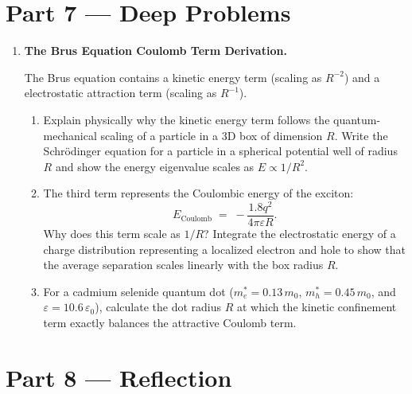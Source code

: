\documentclass[12pt, a4paper]{book}
\begin{document}
\newpage

\section{Part 7 --- Deep Problems}

\begin{deepbox}
\begin{enumerate}[label=\textbf{D\arabic*.}]
  \item \textbf{The Brus Equation Coulomb Term Derivation.}
  
        The Brus equation contains a kinetic energy term (scaling as $R^{-2}$) and a electrostatic attraction term (scaling as $R^{-1}$).
        \begin{enumerate}[label=(\alph*)]
          \item Explain physically why the kinetic energy term follows the quantum-mechanical scaling of a particle in a 3D box of dimension $R$. Write the Schrödinger equation for a particle in a spherical potential well of radius $R$ and show the energy eigenvalue scales as $E \propto 1/R^2$.
          \item The third term represents the Coulombic energy of the exciton:
                \[
                  E_{\text{Coulomb}} \;=\; -\frac{1.8 q^2}{4\pi \varepsilon R}.
                \]
                Why does this term scale as $1/R$? Integrate the electrostatic energy of a charge distribution representing a localized electron and hole to show that the average separation scales linearly with the box radius $R$.
          \item For a cadmium selenide quantum dot ($m_e^* = 0.13\,m_0$, $m_h^* = 0.45\,m_0$, and $\varepsilon = 10.6\,\varepsilon_0$), calculate the dot radius $R$ at which the kinetic confinement term exactly balances the attractive Coulomb term.
        \end{enumerate}
\end{enumerate}
\end{deepbox}

\newpage

\section{Part 8 --- Reflection}
\end{document}

